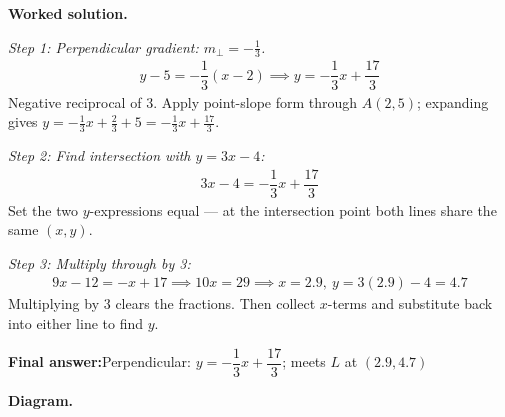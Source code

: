 \documentclass[11pt]{article}
\begin{document}
\textbf{Worked solution.}

\textit{Step 1: Perpendicular gradient: \( m_\perp = -\frac{1}{3} \).}
\[\begin{gathered}
y - 5 = -\dfrac{1}{3}(x - 2) \implies y = -\dfrac{1}{3}x + \dfrac{17}{3}
\end{gathered}\]
Negative reciprocal of \( 3 \). Apply point-slope form through \( A(2, 5) \); expanding gives \( y = -\tfrac{1}{3}x + \tfrac{2}{3} + 5 = -\tfrac{1}{3}x + \tfrac{17}{3} \).

\textit{Step 2: Find intersection with \( y = 3x - 4 \):}
\[\begin{gathered}
3x - 4 = -\dfrac{1}{3}x + \dfrac{17}{3}
\end{gathered}\]
Set the two \( y \)-expressions equal --- at the intersection point both lines share the same \( (x, y) \).

\textit{Step 3: Multiply through by 3:}
\[\begin{gathered}
9x - 12 = -x + 17 \implies 10x = 29 \implies x = 2.9,\ y = 3(2.9) - 4 = 4.7
\end{gathered}\]
Multiplying by \( 3 \) clears the fractions. Then collect \( x \)-terms and substitute back into either line to find \( y \).

\begin{answerbox}
\textbf{Final answer:}\quad Perpendicular: \(\displaystyle y = -\dfrac{1}{3}x + \dfrac{17}{3}\); meets \(\displaystyle L\) at \(\displaystyle (2.9, 4.7)\)
\end{answerbox}
\textbf{Diagram.}
\end{document}
